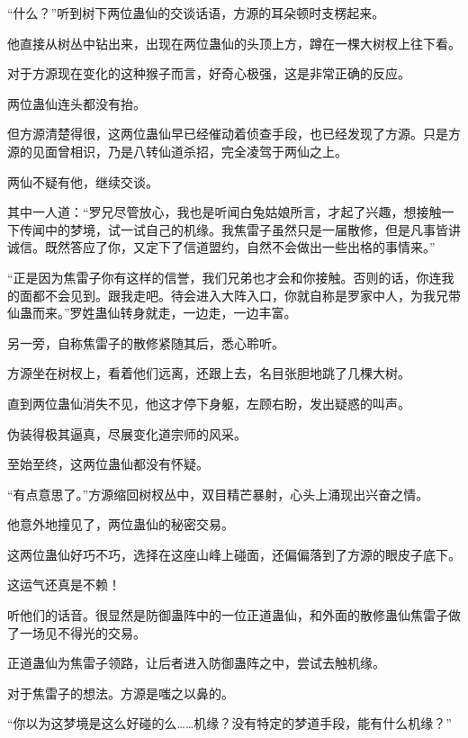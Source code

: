 
\begin{this_body}



“什么？”听到树下两位蛊仙的交谈话语，方源的耳朵顿时支楞起来。

他直接从树丛中钻出来，出现在两位蛊仙的头顶上方，蹲在一棵大树杈上往下看。

对于方源现在变化的这种猴子而言，好奇心极强，这是非常正确的反应。

两位蛊仙连头都没有抬。

但方源清楚得很，这两位蛊仙早已经催动着侦查手段，也已经发现了方源。只是方源的见面曾相识，乃是八转仙道杀招，完全凌驾于两仙之上。

两仙不疑有他，继续交谈。

其中一人道：“罗兄尽管放心，我也是听闻白兔姑娘所言，才起了兴趣，想接触一下传闻中的梦境，试一试自己的机缘。我焦雷子虽然只是一届散修，但是凡事皆讲诚信。既然答应了你，又定下了信道盟约，自然不会做出一些出格的事情来。”

“正是因为焦雷子你有这样的信誉，我们兄弟也才会和你接触。否则的话，你连我的面都不会见到。跟我走吧。待会进入大阵入口，你就自称是罗家中人，为我兄带仙蛊而来。”罗姓蛊仙转身就走，一边走，一边丰富。

另一旁，自称焦雷子的散修紧随其后，悉心聆听。

方源坐在树杈上，看着他们远离，还跟上去，名目张胆地跳了几棵大树。

直到两位蛊仙消失不见，他这才停下身躯，左顾右盼，发出疑惑的叫声。

伪装得极其逼真，尽展变化道宗师的风采。

至始至终，这两位蛊仙都没有怀疑。

“有点意思了。”方源缩回树杈丛中，双目精芒暴射，心头上涌现出兴奋之情。

他意外地撞见了，两位蛊仙的秘密交易。

这两位蛊仙好巧不巧，选择在这座山峰上碰面，还偏偏落到了方源的眼皮子底下。

这运气还真是不赖！

听他们的话音。很显然是防御蛊阵中的一位正道蛊仙，和外面的散修蛊仙焦雷子做了一场见不得光的交易。

正道蛊仙为焦雷子领路，让后者进入防御蛊阵之中，尝试去触机缘。

对于焦雷子的想法。方源是嗤之以鼻的。

“你以为这梦境是这么好碰的么……机缘？没有特定的梦道手段，能有什么机缘？”


\end{this_body}
